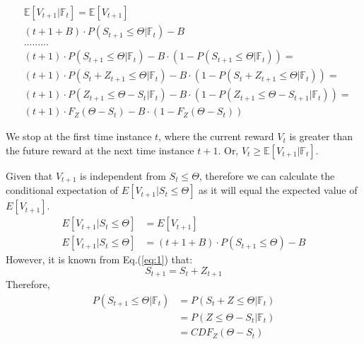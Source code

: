 \documentclass{mpaper}
\begin{document}
\begin{align*}
    &\mathbb{E}[V_{t+1}|\mathbb{F}_{t}] = \mathbb{E}[V_{t+1}]\\
    &(t + 1 + B) \cdot P(S_{t+1} \leq \Theta | \mathbb{F}_t) - B\\
    &.........\\
    &(t+1)\cdot P(S_{t+1} \leq \Theta | \mathbb{F}_{t}) - B\cdot (1 - P(S_{t+1} \leq \Theta | \mathbb{F}_{t}))= \\ 
    &(t+1)\cdot P(S_{t}+Z_{t+1} \leq \Theta | \mathbb{F}_{t}) - B\cdot (1 - P(S_{t}+Z_{t+1} \leq \Theta | \mathbb{F}_{t}))=\\
    &(t+1)\cdot P(Z_{t+1} \leq \Theta-S_{t} | \mathbb{F}_{t}) - B\cdot (1 - P(Z_{t+1} \leq \Theta-S_{t+1} | \mathbb{F}_{t}))=\\
    &(t+1)\cdot F_{Z}(\Theta-S_{t}) - B\cdot (1 - F_{Z}(\Theta-S_{t}))
\end{align*}

We stop at the first time instance $t$, where the current reward $V_{t}$ is greater than the future reward at the next time instance $t+1$. 
Or, $V_{t} \geq \mathbb{E}[V_{t+1}|\mathbb{F}_{t}]$.


Given that $V_{t+1}$ is independent from $S_t \leq \Theta$, therefore we can calculate the conditional expectation of \newline$E[V_{t+1}|S_t\leq\Theta]$ as it will equal the expected value of $E[V_{t+1}]$.
\begin{align*}
    E[V_{t+1}|S_t\leq\Theta] &= E[V_{t+1}]\\
    E[V_{t+1}|S_t\leq\Theta] &= (t+1+B) \cdot P(S_{t+1}\leq\Theta) - B
\end{align*}
However, it is known from Eq.(\ref{eq:1}) that:
\begin{equation}
    S_{t+1} = S_t + Z_{t+1}
\end{equation}
Therefore, 
\begin{align*}
    P(S_{t+1} \leq \Theta | \mathbb{F}_t) &= P(S_t + Z \leq \Theta| \mathbb{F}_t)\\
                           &= P(Z\leq\Theta-S_t| \mathbb{F}_t)\\
                           &= CDF_{Z}(\Theta - S_t)
\end{align*}
\end{document}
